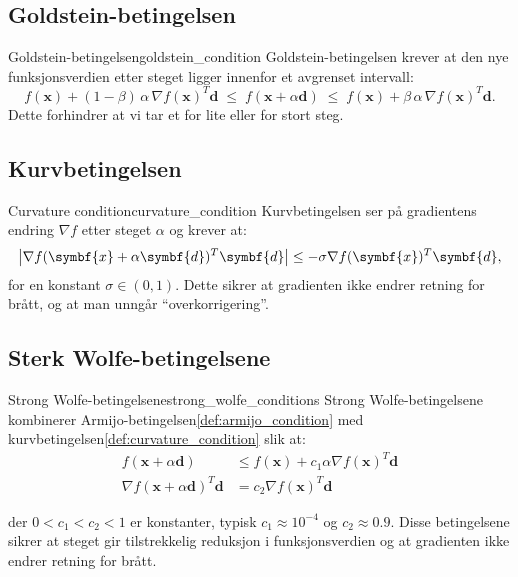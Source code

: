 \subsection{Goldstein-betingelsen}
\begin{definition}{Goldstein-betingelsen}{goldstein_condition}
	Goldstein-betingelsen krever at den nye funksjonsverdien etter steget ligger innenfor et avgrenset intervall:
	\[
		f(\symbf{x}) + (1-\beta)\,\alpha\,\nabla f(\symbf{x})^T \symbf{d}
		\;\le\;
		f(\symbf{x} + \alpha \symbf{d})
		\;\le\;
		f(\symbf{x}) + \beta\,\alpha\,\nabla f(\symbf{x})^T \symbf{d}.
	\]
	Dette forhindrer at vi tar et for lite eller for stort steg.
\end{definition}

\subsection{Kurvbetingelsen}
\begin{definition}{Curvature condition}{curvature_condition}
	Kurvbetingelsen ser på gradientens endring \(\nabla f\) etter steget \(\alpha\) og krever at:
	\[
		\abs*{\nabla f(\symbf{x} + \alpha \symbf{d})^T \symbf{d}} \le -\sigma \nabla f(\symbf{x})^T \symbf{d},
	\]
	for en konstant \(\sigma \in (0,1)\). Dette sikrer at gradienten ikke endrer retning for brått, og at man unngår “overkorrigering”.
\end{definition}

\subsection{Sterk Wolfe-betingelsene}
\begin{definition}{Strong Wolfe-betingelsene}{strong_wolfe_conditions}
	Strong Wolfe-betingelsene kombinerer Armijo-betingelsen\ref{def:armijo_condition} med kurvbetingelsen\ref{def:curvature_condition} slik at:
	\begin{align*}
		f(\symbf{x} + \alpha \symbf{d})                    & \leq f(\symbf{x}) + c_1 \alpha \nabla f(\symbf{x})^T \symbf{d} \\
		\nabla f(\symbf{x} + \alpha \symbf{d})^T \symbf{d} & = c_2 \nabla f(\symbf{x})^T \symbf{d}
	\end{align*}

	der \(0 < c_1 < c_2 < 1\) er konstanter, typisk \(c_1 \approx 10^{-4}\) og \(c_2 \approx 0.9\).
	\medskip
	Disse betingelsene sikrer at steget gir tilstrekkelig reduksjon i funksjonsverdien og at gradienten ikke endrer retning for brått.
\end{definition}

